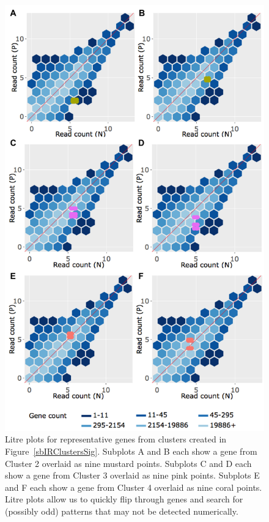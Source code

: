 \documentclass{bioinfo}
\begin{document}
\begin{figure}[!tpb]
\centerline{\includegraphics[width=\columnwidth]{../Bioinformatics/Pictures/litrePlots/N_P/litre6LB.png}}
\caption{Litre plots for representative genes from clusters created in Figure~\ref{sbIRClustersSig}. Subplots A and B each show a gene from Cluster 2 overlaid as nine mustard points. Subplots C and D each show a gene from Cluster 3 overlaid as nine pink points. Subplots E and F each show a gene from Cluster 4 overlaid as nine coral points. Litre plots allow us to quickly flip through genes and search for (possibly odd) patterns that may not be detected numerically.
\label{repDot}}
\end{figure}
\end{document}
